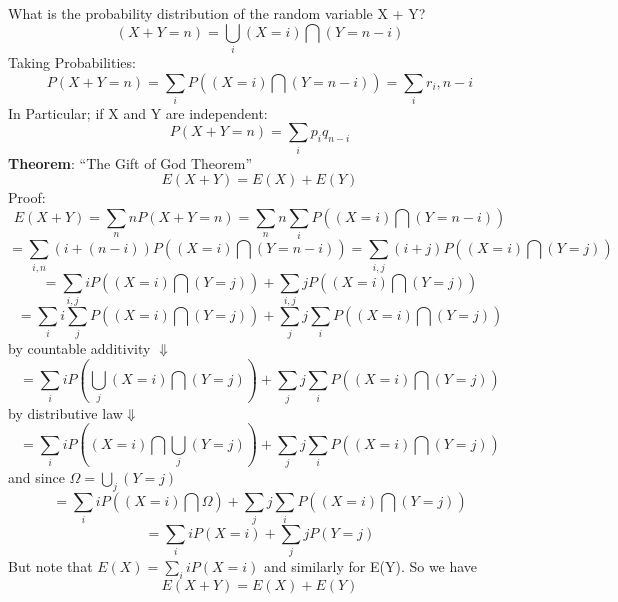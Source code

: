 \indent What is the probability distribution of the random variable X + Y?
\begin{displaymath}(X + Y = n) = \bigcup_i (X = i) \bigcap (Y = n-i)\end{displaymath}
\indent Taking Probabilities:
\begin{displaymath}P(X + Y = n) = \sum_i P((X = i) \bigcap (Y = n-i)) = \sum_i r_i, n-i\end{displaymath}
\indent In Particular;  if X and Y are independent:
\begin{displaymath}P(X + Y = n) = \sum_i p_iq_{n-i}\end{displaymath}
{\large\bf Theorem}:  ``The Gift of God Theorem''
{\bf \begin{displaymath}E(X + Y) = E(X) + E(Y)\end{displaymath}}
Proof:\begin{displaymath}E(X+Y)=\sum_n nP(X+Y=n)=\sum_n n \sum_iP((X=i)\bigcap(Y=n-i))\end{displaymath}
\begin{displaymath}=\sum_{i,n}(i+(n-i))P((X=i)\bigcap(Y=n-i)) = \sum_{i,j}(i+j)P((X=i)\bigcap(Y=j))\end{displaymath}
\begin{displaymath}=\sum_{i,j}iP((X=i)\bigcap(Y=j))+\sum_{i,j}jP((X=i)\bigcap(Y=j))\end{displaymath}
\begin{displaymath}=\sum_ii\sum_jP((X=i)\bigcap(Y=j))+\sum_jj\sum_iP((X=i)\bigcap(Y=j))\end{displaymath}
by countable additivity
$\Downarrow$
\begin{displaymath}=\sum_iiP(\bigcup_j(X=i)\bigcap(Y=j))+\sum_jj\sum_iP((X=i)\bigcap(Y=j))\end{displaymath}
by distributive law$\Downarrow$
\begin{displaymath}=\sum_iiP((X=i)\bigcap\bigcup_j(Y=j))+\sum_jj\sum_iP((X=i)\bigcap(Y=j))\end{displaymath}
and since $\Omega = \bigcup_j(Y=j)$
\begin{displaymath}=\sum_iiP((X=i)\bigcap\Omega)+\sum_jj\sum_iP((X=i)\bigcap(Y=j))\end{displaymath}
\begin{displaymath}=\sum_iiP(X=i) + \sum_jjP(Y=j)\end{displaymath}
But note that $E(X)=\sum_iiP(X=i)$ and similarly for E(Y). So we have
\begin{displaymath} E(X+Y)= E(X) + E(Y)\end{displaymath}
